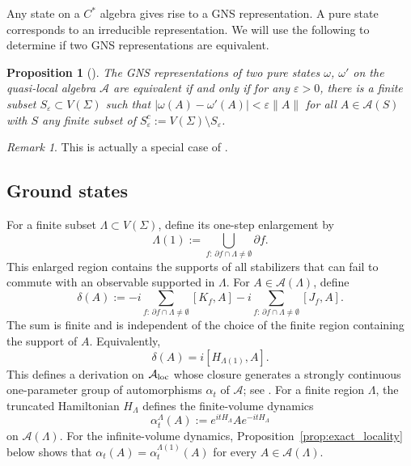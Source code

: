 \documentclass[a4paper,11pt]{article}
\newtheorem{proposition}[theorem]{Proposition}
\theoremstyle{definition}
\theoremstyle{remark}
\newtheorem{remark}{Remark}[section]
\theoremstyle{remark}
\begin{document}
Any state on a $C^*$ algebra gives rise to a GNS representation. A pure state corresponds to an irreducible representation.
We will use the following to determine if two GNS representations are equivalent. 

\begin{proposition}[{\cite[Proposition~3.2.8]{naaijkens2017quantum}}] \label{prop:equiv_GNS}
    The GNS representations of two pure states $\omega$, $\omega'$ on the quasi-local algebra $\mathcal{A}$ are equivalent if and only if for any $\varepsilon>0$, there is a finite subset $S_\varepsilon\subset V(\Sigma)$ such that $|\omega(A) - \omega'(A)| <\varepsilon\|A\|$ for all $A\in \mathcal{A}(S)$ with $S$ any finite subset of $S_{\varepsilon}^c := V(\Sigma)\setminus S_\varepsilon$. 
\end{proposition}

\begin{remark}
    This is actually a special case of \cite[Corollary 2.6.11]{bratteli1987operator}. 
\end{remark}






\subsection{Ground states}


For a finite subset $\Lambda\subset V(\Sigma)$, define its one-step enlargement by
\[
    \Lambda(1) := \bigcup_{f:\,\partial f\cap\Lambda\neq\emptyset}\partial f.
\]
This enlarged region contains the supports of all stabilizers that can fail to commute with an observable supported in $\Lambda$. For $A\in\mathcal A(\Lambda)$, define 
\[
    \delta(A):=-i\sum_{f:\,\partial f\cap\Lambda\neq\emptyset}[K_f,A]-i\sum_{f:\,\partial f\cap\Lambda\neq\emptyset}[J_f,A]. 
\]
The sum is finite and is independent of the choice of the finite region containing the support of $A$. Equivalently, 
\[
    \delta(A)=i[H_{\Lambda(1)},A]. 
\]
This defines a derivation on $\mathcal A_{\rm loc}$ whose closure generates a strongly continuous one-parameter group of automorphisms $\alpha_t$ of $\mathcal A$; see \cite[Theorem~6.2.4]{bratteli1997operator}. For a finite region $\Lambda$, the truncated Hamiltonian $H_\Lambda$ defines the finite-volume dynamics 
\[
    \alpha_t^\Lambda(A):=e^{itH_\Lambda}Ae^{-itH_\Lambda}
\]
on $\mathcal A(\Lambda)$. For the infinite-volume dynamics, Proposition~\ref{prop:exact_locality} below shows that $\alpha_t(A)=\alpha_t^{\Lambda(1)}(A)$ for every $A\in\mathcal A(\Lambda)$.
\end{document}
